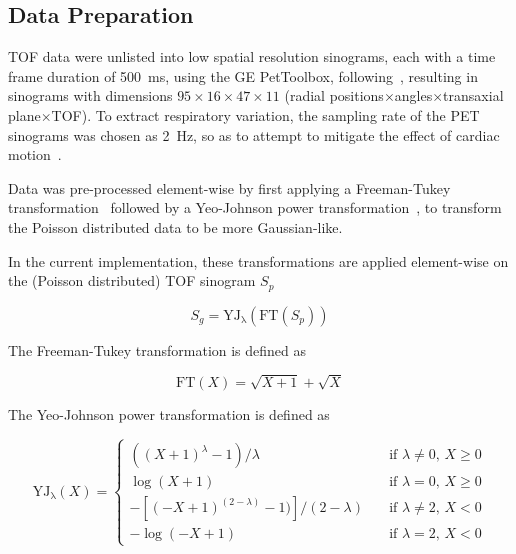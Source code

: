     \subsection{Data Preparation} \label{sec:data_preparation}
        \gls{TOF} data were unlisted into low spatial resolution sinograms, each with a time frame duration of \SI{500}{\milli\second}, using the \gls{GE} PetToolbox, following~\parencite{Bertolli2017DataData}, resulting in sinograms with dimensions $95\times16\times47\times11$ (radial positions$\times$angles$\times$transaxial plane$\times$\gls{TOF}). To extract respiratory variation, the sampling rate of the \gls{PET} sinograms was chosen as \SI{2}{\hertz}, so as to attempt to mitigate the effect of cardiac motion~\parencite{Bertolli2018Data-DrivenTomography}.
        
        Data was pre-processed element-wise by first applying a Freeman-Tukey transformation~\parencite{Freeman1950TransformationsRoot} followed by a Yeo-Johnson power transformation~\parencite{Yeo2000ASymmetry}, to transform the Poisson distributed data to be more Gaussian-like.

        In the current implementation, these transformations are applied element-wise on the (Poisson distributed) \gls{TOF} sinogram $S_p$
        
        \begin{equation} \label{eq:freeman_tukey_yeo_johnson}
            S_g = \mathrm{YJ_\lambda}(\mathrm{FT}(S_p))
        \end{equation}

        The Freeman-Tukey transformation is defined as
        
        \begin{equation} \label{eq:freeman_tukey}
            \mathrm{FT}(X) = \sqrt{X + 1} + \sqrt{X}
        \end{equation}
        
        The Yeo-Johnson power transformation is defined as
        
        \begin{equation} \label{eq:yeo_johnson}
            \mathrm{YJ_\lambda}(X) =   \begin{cases}
                        ((X + 1)^\lambda - 1) / \lambda                   & \quad \text{if } \lambda \neq 0 \text{, } X \geq 0 \\
                        \log(X + 1)                                       & \quad \text{if } \lambda = 0 \text{, } X \geq 0    \\
                        -[(-X + 1)^{(2 - \lambda)} - 1)] / (2 - \lambda)  & \quad \text{if } \lambda \neq 2 \text{, } X < 0    \\
                        -\log(-X + 1)                                     & \quad \text{if } \lambda = 2 \text{, } X < 0
                    \end{cases}
        \end{equation}
        
